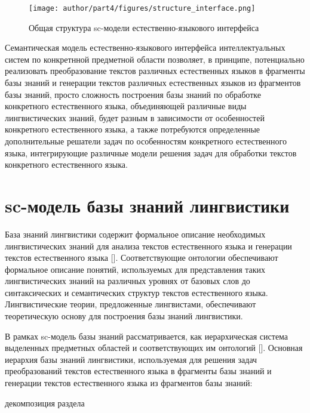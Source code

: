 \begin{figure}[H]
	\texttt{[image: author/part4/figures/structure\_interface.png]}
	\caption{Общая структура sc-модели естественно-языкового интерфейса}
	\label{fig:structure-sc-model-natural-interface}
\end{figure}

Семантическая модель естественно-языкового интерфейса интеллектуальных систем по конкретнной предметной области позволяет, в принципе, потенциально реализовать преобразование текстов различных естественных языков в фрагменты базы знаний и генерации текстов различных естественных языков из фрагментов базы знаний, просто сложность построения базы знаний по обработке конкретного естественного языка, объединяющей различные виды лингвистических знаний, будет разным в зависимости от особенностей конкретного естественного языка, а также потребуются определенные дополнительные решатели задач по особенностям конкретного естественного языка, интегрирующие различные модели решения задач для обработки текстов конкретного естественного языка.

\section{sc-модель базы знаний лингвистики}
База знаний лингвистики содержит формальное описание необходимых лингвистических знаний для анализа текстов естественного языка и генерации текстов естественного языка []. Соответствующие онтологии обеспечивают формальное описание понятий, используемых для представления таких лингвистических знаний на различных уровнях от базовых слов до синтаксических и семантических структур текстов естественного языка. Лингвистические теории, предложенные лингвистами, обеспечивают теоретическую основу для построения базы знаний лингвистики. 

В рамках  sc-модель базы знаний рассматривается, как иерархическая система выделенных предметных областей и соответствующих им онтологий []. Основная иерархия базы знаний лингвистики, используемая для решения задач преобразований текстов естественного языка в фрагменты базы знаний и генерации текстов естественного языка из фрагментов базы знаний:
\begin{SCn}
	\begin{scnrelfromset}{декомпозиция раздела}
	\end{scnrelfromset}
\end{SCn}

